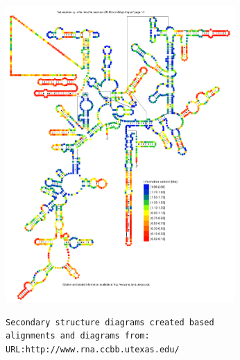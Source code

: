 \documentclass[landscape]{slides}
\begin{document}
\begin{slide}
\begin{center}
\includegraphics[height=4.45in]{figs/euk_info_heat}
\end{center}

\begin{flushright}
\tiny{\texttt{Secondary structure diagrams created based}} \\
\tiny{\texttt{alignments and diagrams from:}} \\
\tiny{\texttt{URL:http://www.rna.ccbb.utexas.edu/}}
\end{flushright}
\vfill
\end{slide}

% 
\end{document}
